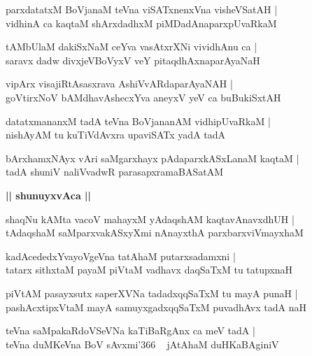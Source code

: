 \documentclass[twoside,12pt,openright]{book}
\newcounter{shloka}[chapter]
\def\uvaca#1{\centerline{{\large\textbf{#1}}}}
\begin{document}
\begin{shloka}%
parxdatatxM BoVjanaM teVna viSATxnenxVna visheVSatAH |\\
vidhinA ca kaqtaM shArxdadhxM piMDadAnaparxpUvaRkaM 
\end{shloka}

\begin{shloka}%
tAMbUlaM dakiSxNaM ceYva vasAtxrXNi vividhAnu ca |\\
saravx dadw divxjeVBoVyxV veY pitaqdhAxnaparAyaNaH 
\end{shloka}

\begin{shloka}%
vipArx visajiRtAsasxrava AshiVvARdaparAyaNAH |\\
goVtirxNoV bAMdhavAshecxYva aneyxV yeV ca buBukiSxtAH 
\end{shloka}

\begin{shloka}%
datatxmananxM tadA teVna BoVjananAM vidhipUvaRkaM |\\
nishAyAM tu kuTiVdAvxra upaviSATx yadA tadA
\end{shloka}

\begin{shloka}%
bArxhamxNAyx vAri saMgarxhayx pAdaparxkASxLanaM kaqtaM |\\
tadA shuniV naliVvadwR parasapxramaBASatAM 
\end{shloka}

\uvaca{|| shunuyxvAca ||}

\begin{shloka}%
shaqNu kAMta vacoV mahayxM yAdaqshAM kaqtavAnavxdhUH |\\
tAdaqshaM saMparxvakASxyXmi nAnayxthA parxbarxviVmayxhaM 
\end{shloka}

\begin{shloka}%
kadAcededxYvayoVgeVna tatAhaM putarxsadamxni |\\
tatarx sithxtaM payaM piVtaM vadhavx daqSaTxM tu tatupxnaH 
\end{shloka}

\begin{shloka}%
piVtAM pasayxsutx saperXVNa tadadxqqSaTxM tu mayA punaH |\\
pashAcxtipxVtaM mayA samuyxgadxqqSaTxM puvadhAvx tadA naH 
\end{shloka}

\begin{shloka}%
teVna saMpakaRdoVSeVNa kaTiBaRgAnx ca meV tadA |\\
teVna duMKeVna BoV sAvxmi\char'366 ~ jAtAhaM duHKaBAginiV 
\end{shloka}
\end{document}
